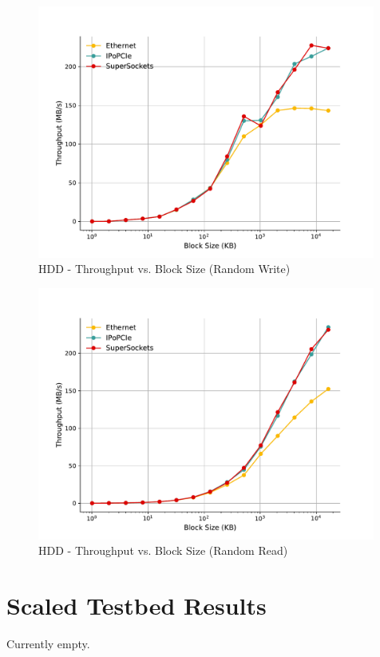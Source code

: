\begin{figure}[H]
    \centering
    \includegraphics[width=0.99\textwidth]{fig/img/fio/throughput_vs_bs_write_rand_ssocks.pdf}
    \caption{HDD - Throughput vs. Block Size (Random Write)}
    \label{fig:hdd_tp_bs_seqread}
\end{figure}

\begin{figure}[H]
    \centering
    \includegraphics[width=0.99\textwidth]{fig/img/fio/throughput_vs_bs_read_rand_ssocks.pdf}
    \caption{HDD - Throughput vs. Block Size (Random Read)}
    \label{fig:hdd_tp_bs_seqread}
\end{figure}

\section{Scaled Testbed Results}

Currently empty.